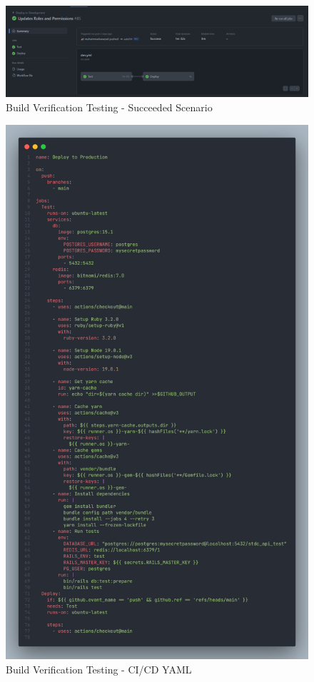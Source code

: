 \begin{justify}
\begin{figure}[H]
    \centerline{\includegraphics[width=150mm,scale=1]{figures/implementation_and_testing/testing/BVT/Succeeded.png}}
    \caption{Build Verification Testing - Succeeded Scenario}
    \label{Build Verification Testing - Succeeded Scenario}
\end{figure}


\begin{figure}[H]
    \centerline{\includegraphics[width=135mm,scale=1]{figures/implementation_and_testing/testing/BVT/CICD Yaml file.png}}
    \caption{Build Verification Testing - CI/CD YAML}
    \label{Course Integration Testing - CI/CD YAML}
\end{figure}

\end{justify}
